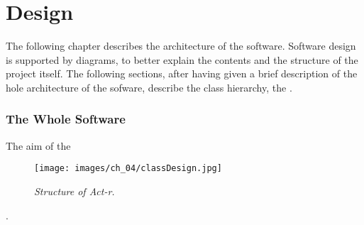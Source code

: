 \chapter{Design}
  The following chapter describes the architecture of the software. 
  Software design is supported by diagrams, to better explain the contents and the structure of the project itself. The following sections, after having given a brief description of the hole architecture of the sofware, describe the class hierarchy, the .
  
  \subsection{The Whole Software}
  The aim of the 
  \begin{figure}[h]
	  \begin{center} 
	    \texttt{[image: images/ch\_04/classDesign.jpg]}
	  \end{center} 
	  \caption{\textit{Structure of Act-r.}}  
	  \label{fig:modulesActr}
  \end{figure}
  .

  
